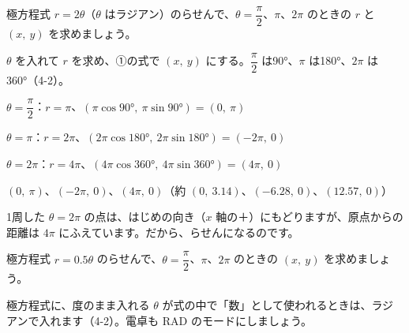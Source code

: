 \begin{reidai}[らせんの極方程式]
極方程式 $r=2\theta$（$\theta$ はラジアン）のらせんで、$\theta=\dfrac{\pi}{2}$、$\pi$、$2\pi$ のときの $r$ と $(x,\ y)$ を求めましょう。\par
\kangaekata $\theta$ を入れて $r$ を求め、①の式で $(x,\ y)$ にする。$\dfrac{\pi}{2}$ は90°、$\pi$ は180°、$2\pi$ は360°（4-2）。\par
\shiki $\theta=\dfrac{\pi}{2}$：$r=\pi$、\enspace $(\pi\cos90°,\ \pi\sin90°)=(0,\ \pi)$\par
\hspace*{2.6\zw}$\theta=\pi$：$r=2\pi$、\enspace $(2\pi\cos180°,\ 2\pi\sin180°)=(-2\pi,\ 0)$\par
\hspace*{2.6\zw}$\theta=2\pi$：$r=4\pi$、\enspace $(4\pi\cos360°,\ 4\pi\sin360°)=(4\pi,\ 0)$\par
\kotae $(0,\ \pi)$、$(-2\pi,\ 0)$、$(4\pi,\ 0)$（約 $(0,\ 3.14)$、$(-6.28,\ 0)$、$(12.57,\ 0)$）
\end{reidai}
1周した $\theta=2\pi$ の点は、はじめの向き（$x$ 軸の＋）にもどりますが、原点からの距離は $4\pi$ にふえています。だから、らせんになるのです。

\begin{jibun}
極方程式 $r=0.5\theta$ のらせんで、$\theta=\dfrac{\pi}{2}$、$\pi$、$2\pi$ のときの $(x,\ y)$ を求めましょう。
\end{jibun}

\begin{tsumazuki}{極方程式に、度のまま入れる}
$\theta$ が式の中で「数」として使われるときは、ラジアンで入れます（4-2）。電卓も RAD のモードにしましょう。
\end{tsumazuki}

